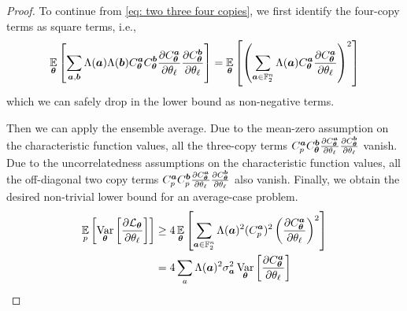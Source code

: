 \documentclass{article}
\theoremstyle{plain}
\theoremstyle{definition}
\theoremstyle{remark}
\begin{document}
\begin{proof}
To continue from \cref{eq: two three four copies}, we first identify the four-copy terms as square terms, i.e., 
\begin{equation}
    \operatorname*{\mathbb{E}}_{{\bm{\theta}}} \left[ \sum_{{\bm{a}}, {\bm{b}}} \Lambda({\bm{a}}) \Lambda({\bm{b}}) C_{\bm{\theta}}^{\bm{a}} C_{\bm{\theta}}^{\bm{b}} \frac{\partial C_{\bm{\theta}}^{\bm{a}}}{\partial \theta_\ell} \frac{\partial C_{\bm{\theta}}^{\bm{b}}}{\partial \theta_\ell}\right] =\operatorname*{\mathbb{E}}_{{\bm{\theta}}}\left[ \left(\sum_{{\bm{a}} \in \mathbb{F}_2^n} \Lambda({\bm{a}}) C_{\bm{\theta}}^{\bm{a}} \frac{\partial C_{\bm{\theta}}^{\bm{a}}}{\partial \theta_\ell}\right)^2\right]
\end{equation}
which we can safely drop in the lower bound as non-negative terms. 

Then we can apply the ensemble average. Due to the mean-zero assumption on the characteristic function values, all the three-copy terms $C^{\bm{a}}_p C_{\bm{\theta}}^{\bm{b}} \frac{\partial C_{\bm{\theta}}^{\bm{a}}}{\partial \theta_\ell} \frac{\partial C_{\bm{\theta}}^{\bm{b}}}{\partial \theta_\ell}$ vanish. Due to the uncorrelatedness assumptions on the characteristic function values, all the off-diagonal two copy terms $C^{\bm{a}}_p C^{\bm{b}}_p \frac{\partial C_{\bm{\theta}}^{\bm{a}}}{\partial \theta_\ell} \frac{\partial C_{\bm{\theta}}^{\bm{b}}}{\partial \theta_\ell}$ also vanish. Finally, we obtain the desired non-trivial lower bound for an average-case problem.
\begin{align}
 \operatorname*{\mathbb{E}}_p\left[\operatorname*{Var}_{{\bm{\theta}}} \left[ \frac{\partial \mathcal{L}_{\bm{\theta}}}{\partial \theta_\ell} \right]\right] &\geq 4 \operatorname*{\mathbb{E}}_{{\bm{\theta}}}  \left[ \sum_{{\bm{a}} \in \mathbb{F}_2^n} \Lambda({\bm{a}})^2 (C^{\bm{a}}_p)^2 \left(\frac{\partial C_{\bm{\theta}}^{\bm{a}}}{\partial \theta_\ell}\right)^2 \right] \\
 &= 4 \sum_a\Lambda({\bm{a}})^2\sigma_{\bm{a}}^2\operatorname*{Var}_{{\bm{\theta}}} \left[ \frac{\partial C^{\bm{a}}_{\bm{\theta}}}{\partial \theta_\ell} \right] 
\end{align}
\end{proof}
\end{document}
